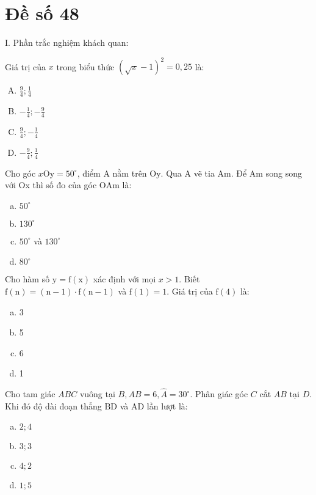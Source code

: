 \section{Đề số 48}

I. Phần trắc nghiệm khách quan:
\begin{bt} 
	Giá trị của $x$ trong biểu thức $(\sqrt{x}-1)^2=0,25$ là:
	\begin{enumerate}[A.]
		\item  $\frac{9}{4} ; \frac{1}{4}$
		\item $-\frac{1}{4} ;-\frac{9}{4}$
		\item $\frac{9}{4} ;-\frac{1}{4}$
		\item $-\frac{9}{4} ; \frac{1}{4}$
	\end{enumerate}
	\loigiai{} 
\end{bt}

\begin{bt}
	Cho góc $x \mathrm{Oy}=50^{\circ}$, điểm $\mathrm{A}$ nằm trên $\mathrm{Oy}$. Qua $\mathrm{A}$ vẽ tia $\mathrm{Am}$. Để Am song song với Ox thì số đo của góc $\mathrm{OAm}$ là:
	\begin{enumerate}[a.]
		\item $50^{\circ}$
		\item $130^{\circ}$
		\item $50^{\circ}$ và $130^{\circ}$
		\item $80^{\circ}$
	\end{enumerate}
	\loigiai{} 
\end{bt}

\begin{bt}
	Cho hàm số $\mathrm{y}=\mathrm{f}(\mathrm{x})$ xác định với mọi $x>1$. Biết $\mathrm{f}(\mathrm{n})=(\mathrm{n}-1) \cdot \mathrm{f}(\mathrm{n}-1)$ và $\mathrm{f}(1)=1$. Giá trị của $\mathrm{f}(4)$ là:
	\begin{enumerate}[a.]
		\item 3
		\item 5
		\item 6
		\item 1
	\end{enumerate}
	\loigiai{} 
\end{bt}

\begin{bt}
	Cho tam giác $A B C$ vuông tại $B, A B=6, \hat{A}=30^{\circ}$. Phân giác góc $C$ cắt $A B$ tại $D$. Khi đó độ dài đoạn thẳng $\mathrm{BD}$ và $\mathrm{AD}$ lần lượt là:
	\begin{enumerate}[a.]
		\item $2 ; 4$
		\item $3 ; 3$
		\item $4 ; 2$
		\item $1 ; 5$
	\end{enumerate}
	\loigiai{} 
\end{bt}

